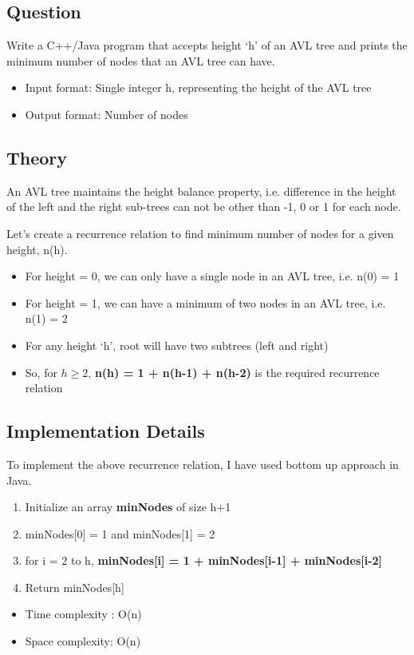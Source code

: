 \documentclass[11pt,a4paper]{article}
\begin{document}
\subsection{Question}\label{sec:question6}
Write a C++/Java program that accepts height ‘h’ of an AVL tree and prints the minimum number of nodes that an AVL tree can have.
\begin{itemize}
    \item Input format: Single integer h, representing the height of the AVL tree
    \item Output format: Number of nodes
\end{itemize}

\subsection{Theory}\label{sec:theory6}
An AVL tree maintains the height balance property, i.e. difference in the height of the left and the right sub-trees can not be other than -1, 0 or 1 for each node.

Let's create a recurrence relation to find minimum number of nodes for a given height, n(h).

\begin{itemize}
  \item For height = 0, we can only have a single node in an AVL tree, i.e. n(0) = 1
  \item For height = 1, we can have a minimum of two nodes in an AVL tree, i.e. n(1) = 2
  \item For any height ‘h’, root will have two subtrees (left and right)
  \item So, for $h \geq 2 $, \textbf { n(h) = 1 + n(h-1) + n(h-2) } is the required recurrence relation
  
\end{itemize}
\subsection{Implementation Details}\label{sec:details6}
To implement the above recurrence relation, I have used bottom up approach in Java.
\begin{enumerate}
  \item Initialize an array \textbf{minNodes} of size h+1
  \item minNodes[0] = 1 and minNodes[1] = 2
  \item for i = 2 to h, \textbf{minNodes[i] = 1 + minNodes[i-1] + minNodes[i-2]}
  \item Return minNodes[h]
\end{enumerate}
\begin{itemize}
    \item Time complexity : O(n)
     \item Space complexity: O(n)
\end{itemize}
\end{document}
